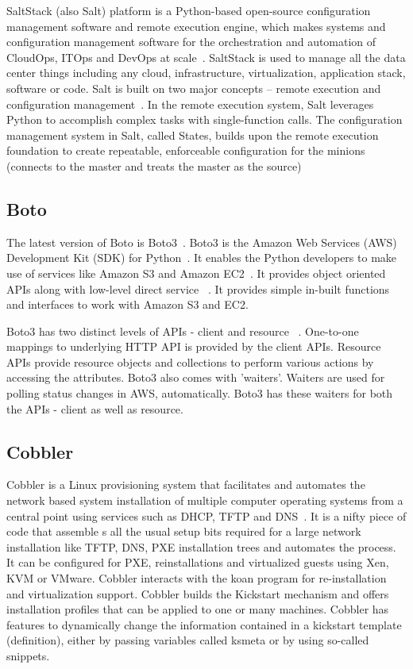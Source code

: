 SaltStack (also Salt) platform is a Python-based open-source
configuration management software and remote execution engine, which
makes systems and configuration management software for the
orchestration and automation of CloudOps, ITOps and DevOps at
scale~\cite{www-saltstack}. SaltStack is used to manage all the data
center things including any cloud, infrastructure, virtualization,
application stack, software or code. Salt is built on two major
concepts -- remote execution and configuration
management~\cite{SaltStack-book}. In the remote execution system, Salt
leverages Python to accomplish complex tasks with single-function
calls. The configuration management system in Salt, called States,
builds upon the remote execution foundation to create repeatable,
enforceable configuration for the minions (connects to the master and
treats the master as the source)

     \pv
     
\subsection{Boto}

The latest version of Boto is Boto3~\cite{www-boto}.  Boto3 is the
Amazon Web Services (AWS) Development Kit (SDK) for
Python~\cite{www-boto-github}. It enables the Python developers to
make use of services like Amazon S3 and Amazon
EC2~\cite{www-boto-amazon-python-sdk}.  It provides object oriented
APIs along with low-level direct service
~\cite{www-boto3-documentation}.  It provides simple in-built
functions and interfaces to work with Amazon S3 and EC2.

Boto3 has two distinct levels of APIs - client and resource
~\cite{www-boto-amazon-python-sdk}. One-to-one mappings to underlying
HTTP API is provided by the client APIs. Resource APIs provide
resource objects and collections to perform various actions by
accessing the attributes.  Boto3 also comes with 'waiters'. Waiters
are used for polling status changes in AWS, automatically. Boto3 has
these waiters for both the APIs - client as well as resource.
     
\subsection{Cobbler}

Cobbler is a Linux provisioning system that facilitates and automates
the network based system installation of multiple computer operating
systems from a central point using services such as DHCP, TFTP and
DNS~\cite{www-cobbler}. It is a nifty piece of code that assemble s
all the usual setup bits required for a large network installation
like TFTP, DNS, PXE installation trees and automates the process. It
can be configured for PXE, reinstallations and virtualized guests
using Xen, KVM or VMware.  Cobbler interacts with the koan program for
re-installation and virtualization support.  Cobbler builds the
Kickstart mechanism and offers installation profiles that can be
applied to one or many machines.  Cobbler has features to dynamically
change the information contained in a kickstart template (definition),
either by passing variables called ksmeta or by using so-called
snippets.

